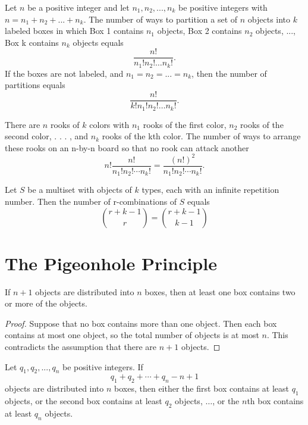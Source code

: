 \begin{theorem}
    \label{thm:2.4.3}
    Let $n$ be a positive integer and let $n_1, n_2, ...  ,n_k$ be positive integers with $n = n_1 + n_2 + ... + n_k$. The number of ways to partition a set of $n$ objects into $k$ labeled boxes in which Box 1 contains $n_1$ objects, Box 2 contains $n_2$ objects, ..., Box k contains $n_k$ objects equals
    \[\frac{n!}{n_1!n_2!\dots n_k!}.\]
    If the boxes are not labeled, and $n_1 = n_2 = ... = n_k$, then the number of partitions equals
    \[\frac{n!}{k!n_1!n_2!\dots n_k!}.\]
\end{theorem}

\begin{theorem}
    \label{thm:2.4.4}
    There are $n$ rooks of $k$ colors with $n_1$ rooks of the first color, $n_2$ rooks of the second color, . . . , and $n_k$ rooks of the kth color. The number of ways to arrange these rooks on an n-by-n board so that no rook can attack another 
    \[n!\frac{n!}{n_1!n_2!\cdots n_k!}=\frac{(n!)^2}{n_1!n_2!\cdots n_k!}.\]
\end{theorem}

\begin{theorem}
    \label{thm:2.5.1}
    Let $S$ be a multiset with objects of $k$ types, each with an infinite repetition number. Then the number of r-combinations of $S$ equals
    \[\binom{r+k-1}{r}=\binom{r+k-1}{k-1}\]
\end{theorem}

\chapter{The Pigeonhole Principle}

\begin{theorem}
    \label{thm:3.1.1}
    \leanok
   If $n + 1$ objects are distributed into $n$ boxes, then at least one box 
contains two or more of the objects.
\end{theorem} 

\begin{proof}
  \leanok
  Suppose that no box contains more than one object. Then each box contains at most one object, so the total number of objects is at most $n$. This contradicts the assumption that there are $n + 1$ objects.
\end{proof}

\begin{theorem}
    \label{thm:3.2.1}
   Let $q_1, q_2, . .. ,q_n$ be positive integers. If
   \[q_1 + q_2 + \cdots + q_n - n + 1\]
objects are distributed into $n$ boxes, then either the first box contains at least $q_1$ objects, or the second box contains at least $q_2$ objects, $\dots$, or the $n$th box contains at least $q_n$ objects.
\end{theorem} 

